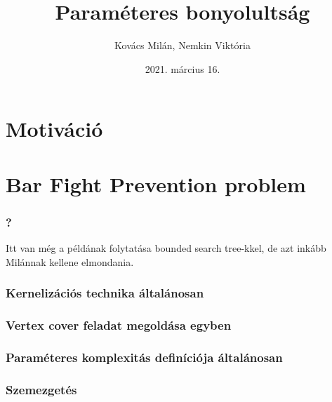 \documentclass[aspectratio=169]{beamer}
\begin{document}
\title{Paraméteres bonyolultság}
\author{Kovács Milán, Nemkin Viktória}
\date{2021. március 16.}

\frame{\titlepage}


\section{Motiváció}







\section{Bar Fight Prevention problem}












\begin{frame}
\frametitle{?}
Itt van még a példának folytatása bounded search tree-kkel, de azt inkább Milánnak kellene elmondania.
\end{frame}

\begin{frame}
\frametitle{Kernelizációs technika általánosan}
\end{frame}


\begin{frame}
\frametitle{Vertex cover feladat megoldása egyben}
\end{frame}

\begin{frame}
\frametitle{Paraméteres komplexitás definíciója általánosan}
\end{frame}

\begin{frame}
\frametitle{Szemezgetés}
\end{frame}
\end{document}
